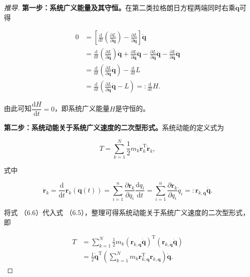 \begin{proof}[推导]
\textbf{第一步：系统广义能量及其守恒。}在第二类拉格朗日方程两端同时右乘$\dot{\boldsymbol{q}}$可得

\[
\begin{aligned}
0 &= \left[\frac{\mathrm{d}}{\mathrm{d}t}\left(\frac{\partial L}{\partial \dot{\boldsymbol{q}}}\right) - \frac{\partial L}{\partial \boldsymbol{q}}\right]\dot{\boldsymbol{q}} \\
&= \frac{\mathrm{d}}{\mathrm{d}t}\left(\frac{\partial L}{\partial \dot{\boldsymbol{q}}}\right)\dot{\boldsymbol{q}} + \frac{\partial L}{\partial \dot{\boldsymbol{q}}}\ddot{\boldsymbol{q}} - \frac{\partial L}{\partial \boldsymbol{q}}\dot{\boldsymbol{q}} - \frac{\partial L}{\partial \dot{\boldsymbol{q}}}\ddot{\boldsymbol{q}} \\
&= \frac{\mathrm{d}}{\mathrm{d}t}\left(\frac{\partial L}{\partial \dot{\boldsymbol{q}}}\dot{\boldsymbol{q}}\right) - \frac{\mathrm{d}}{\mathrm{d}t}L \\
&= \frac{\mathrm{d}}{\mathrm{d}t}\left(\frac{\partial L}{\partial \dot{\boldsymbol{q}}}\dot{\boldsymbol{q}} - L\right) =: \frac{\mathrm{d}}{\mathrm{d}t}H.
\end{aligned}
\]

由此可知$\dfrac{\mathrm{d}H}{\mathrm{d}t} = 0$，即系统广义能量$H$是守恒的。

\textbf{第二步：系统动能关于系统广义速度的二次型形式。}系统动能的定义式为

\[
T = \sum_{k=1}^{N}\frac{1}{2}m_k\dot{\boldsymbol{r}}_k^{\mathrm{T}}\dot{\boldsymbol{r}}_k,
\]

式中

\[
\dot{\boldsymbol{r}}_k = \frac{\mathrm{d}}{\mathrm{d}t}\boldsymbol{r}_k(\boldsymbol{q}(t)) = \sum_{i=1}^{n}\frac{\partial \boldsymbol{r}_k}{\partial q_i}\frac{\mathrm{d}q_i}{\mathrm{d}t} = \sum_{i=1}^{n}\frac{\partial \boldsymbol{r}_k}{\partial q_i}\dot{q}_i =: \boldsymbol{r}_{k,\boldsymbol{q}}\dot{\boldsymbol{q}}.
\]

将式 （6.6）代入式 （6.5），整理可得系统动能关于系统广义速度的二次型形式，即

\[
\begin{aligned}
T &= \sum_{k=1}^{N}\frac{1}{2}m_k\left(\boldsymbol{r}_{k,\boldsymbol{q}}\dot{\boldsymbol{q}}\right)^{\mathrm{T}}\left(\boldsymbol{r}_{k,\boldsymbol{q}}\dot{\boldsymbol{q}}\right) \\
&= \frac{1}{2}\dot{\boldsymbol{q}}^{\mathrm{T}}\left(\sum_{k=1}^{N}m_k\boldsymbol{r}_{k,\boldsymbol{q}}^{\mathrm{T}}\boldsymbol{r}_{k,\boldsymbol{q}}\right)\dot{\boldsymbol{q}}.
\end{aligned}
\]


\end{proof}
